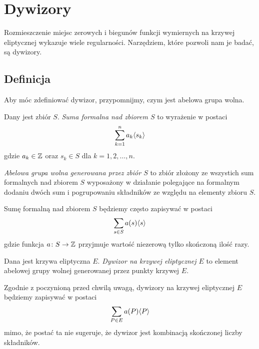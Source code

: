 \section{Dywizory}

Rozmieszczenie miejsc zerowych i biegunów
funkcji wymiernych na krzywej eliptycznej
wykazuje wiele regularności.
Narzędziem, które pozwoli nam je badać, są dywizory.

\subsection*{Definicja}

Aby móc zdefiniować dywizor,
przypomnijmy, czym jest abelowa grupa wolna.

\begin{definition}
Dany jest zbiór $S$.
\emph{Suma formalna nad zbiorem $S$} to wyrażenie w postaci
\begin{equation*}
\sum_{k=1}^n a_k\langle s_k\rangle
\end{equation*}
gdzie $a_k \in \mathbb{Z}$ oraz $s_k \in S$ dla $k = 1, 2, \ldots, n$.

\emph{Abelowa grupa wolna generowana przez zbiór $S$}
to zbiór złożony ze wszystich sum formalnych nad zbiorem $S$
wyposażony w działanie polegające na formalnym dodaniu dwóch sum
i pogrupowaniu składników ze względu na elementy zbioru $S$.
\end{definition}

\begin{remark}
Sumę formalną nad zbiorem $S$ będziemy często zapisywać w postaci
\begin{equation*}
\sum_{s \in S}a(s)\langle s\rangle
\end{equation*}
gdzie funkcja $a \colon S \to \mathbb{Z}$ przyjmuje wartość niezerową
tylko skończoną ilość razy.
\end{remark}

\begin{definition}
Dana jest krzywa eliptyczna $E$.
\emph{Dywizor na krzywej eliptycznej $E$}
to element abelowej grupy wolnej generowanej przez punkty krzywej $E$.
\end{definition}

\begin{remark}
Zgodnie z poczynioną przed chwilą uwagą,
dywizory na krzywej eliptycznej $E$ będziemy zapisywać w postaci
\begin{equation*}
\sum_{P \in E} a(P)\langle P\rangle
\end{equation*}
mimo, że postać ta nie sugeruje,
że dywizor jest kombinacją skończonej liczby składników.
\end{remark}

